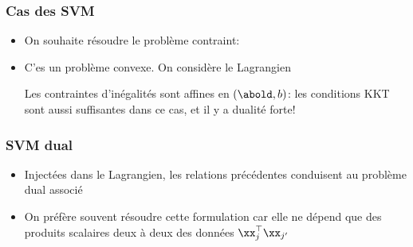\documentclass[9pt,table]{beamer} %
\begin{document}
\begin{frame}
\frametitle{Cas des SVM}

\begin{itemize}[label=\tiny$\blacksquare$]
	\item On souhaite résoudre le problème contraint:
	

	\item C'es un problème \alert{convexe}. On considère le \alert{Lagrangien}
	
	Les contraintes d'inégalités sont \alert{affines} en $(\abold,b)$: les conditions KKT sont aussi \alert{suffisantes} dans ce cas, et il y a \alert{dualité forte}!
	
	
\end{itemize}
	
\end{frame}


\begin{frame}
\frametitle{SVM dual}

\begin{itemize}[label=\tiny$\blacksquare$]
	\item Injectées dans le Lagrangien, les relations précédentes conduisent au problème dual associé
	
	\item On préfère souvent résoudre cette formulation car elle ne dépend que des produits scalaires deux à deux des données $\xx_j^\top \xx_{j'}$
\end{itemize}
	

\end{frame}
\end{document}
